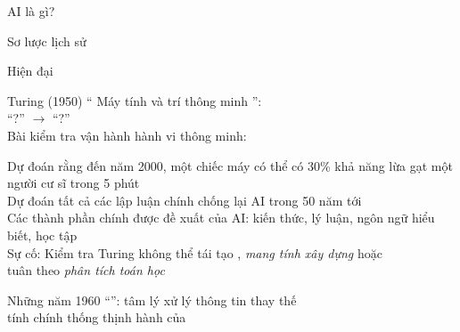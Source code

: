 \documentclass{article}
\begin{document}
\begin{huge}

\sf


\blob AI là gì?

\blob Sơ lược lịch sử

\blob Hiện đại



\vspace*{1in}

\centerline{  }



Turing (1950) `` Máy tính và trí thông minh '':\\
\blob ``?'' $\longrightarrow$ ``?''\\
\blob Bài kiểm tra vận hành hành vi thông minh: 

\vspace*{0.05in}

\textwidth
{}

\vspace*{-0.2in}

\blob Dự đoán rằng đến năm 2000, một chiếc máy có thể có 30\% khả năng \al
     lừa gạt một người cư sĩ trong 5 phút\\
\blob Dự đoán tất cả các lập luận chính chống lại AI trong 50 năm tới\\
\blob Các thành phần chính được đề xuất của AI: kiến thức, lý luận, ngôn ngữ\al
     hiểu biết, học tập\\[0,1in]
Sự cố: Kiểm tra Turing không thể tái tạo \emph{}, \emph{mang tính xây dựng} hoặc \\
tuân theo \emph{phân tích toán học}


Những năm 1960 ``'': tâm lý xử lý thông tin thay thế\\
tính chính thống thịnh hành của 


\end{huge}
\end{document}
